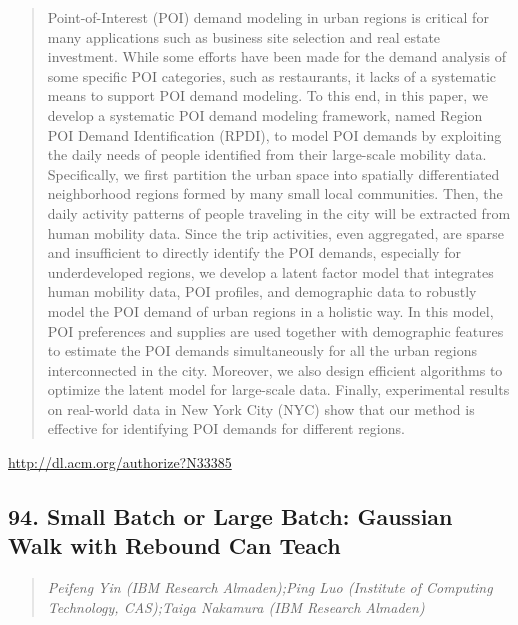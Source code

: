 \documentclass{article}
\begin{document}
\begin{quote}
Point-of-Interest (POI) demand modeling in urban regions is critical for many applications such as business site selection and real estate investment. While some efforts have been made for the demand analysis of some specific POI categories, such as restaurants, it lacks of a systematic means to support POI demand modeling. To this end, in this paper, we develop a systematic POI demand modeling framework, named Region POI Demand Identification (RPDI), to model POI demands by exploiting the daily needs of people identified from their large-scale mobility data. Specifically, we first partition the urban space into spatially differentiated neighborhood regions formed by many small local communities. Then, the daily activity patterns of people traveling in the city will be extracted from human mobility data. Since the trip activities, even aggregated, are sparse and insufficient to directly identify the POI demands, especially for underdeveloped regions, we develop a latent factor model that integrates human mobility data, POI profiles, and demographic data to robustly model the POI demand of urban regions in a holistic way. In this model, POI preferences and supplies are used together with demographic features to estimate the POI demands simultaneously for all the urban regions interconnected in the city. Moreover, we also design efficient algorithms to optimize the latent model for large-scale data. Finally, experimental results on real-world data in New York City (NYC) show that our method is effective for identifying POI demands for different regions.
\end{quote}

\href{http://dl.acm.org/authorize?N33385}{http://dl.acm.org/authorize?N33385}

\subsection{94. Small Batch or Large Batch: Gaussian Walk with Rebound Can Teach}

\begin{quote}
\footnotesize{\textit{Peifeng Yin (IBM Research Almaden);Ping Luo (Institute of Computing Technology, CAS);Taiga Nakamura (IBM Research Almaden)}}

\end{quote}
\end{document}
